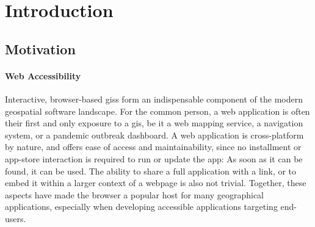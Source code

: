 \chapter{Introduction}

\section{Motivation}


\subsubsection*{ Web Accessibility }
Interactive, browser-based \ac{giss} form an indispensable component of the modern geospatial software landscape. 
For the common person, a web application is often their first and only exposure to a \acs{gis}, be it a web mapping service, a navigation system, or a pandemic outbreak dashboard. 
A web application is cross-platform by nature, and offers ease of access and  maintainability, since no installment or app-store interaction is required to run or update the app: 
As soon as it can be found, it can be used.
The ability to share a full application with a link, or to embed it within a larger context of a webpage is also not trivial. 
Together, these aspects have made the browser a popular host for many geographical applications, especially when developing accessible applications targeting end-users. 







